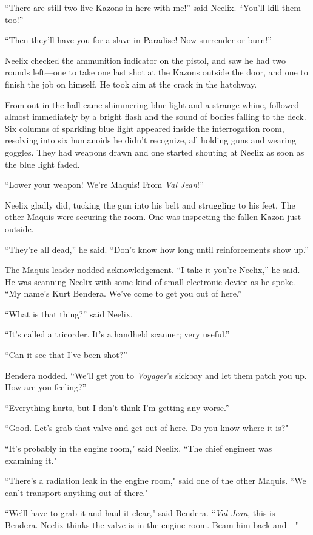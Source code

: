 \documentclass[twoside,letterpaper,12pt]{memoir}
\begin{document}
“There are still two live Kazons in here with me!” said Neelix. “You’ll kill them too!”

“Then they’ll have you for a slave in Paradise! Now surrender or burn!”

Neelix checked the ammunition indicator on the pistol, and saw he had two rounds left—one to take one last shot at the Kazons outside the door, and one to finish the job on himself. He took aim at the crack in the hatchway.

From out in the hall came shimmering blue light and a strange whine, followed almost immediately by a bright flash and the sound of bodies falling to the deck. Six columns of sparkling blue light appeared inside the interrogation room, resolving into six humanoids he didn’t recognize, all holding guns and wearing goggles. They had weapons drawn and one started shouting at Neelix as soon as the blue light faded.

“Lower your weapon! We’re Maquis! From \textit{Val Jean}!”

Neelix gladly did, tucking the gun into his belt and struggling to his feet. The other Maquis were securing the room. One was inspecting the fallen Kazon just outside.

“They’re all dead,” he said. “Don’t know how long until reinforcements show up.”

The Maquis leader nodded acknowledgement. “I take it you’re Neelix,” he said. He was scanning Neelix with some kind of small electronic device as he spoke. “My name’s Kurt Bendera. We’ve come to get you out of here.”

“What is that thing?” said Neelix.

“It’s called a tricorder. It’s a handheld scanner; very useful.”

“Can it see that I’ve been shot?”

Bendera nodded. “We’ll get you to \textit{Voyager}’s sickbay and let them patch you up. How are you feeling?”

“Everything hurts, but I don’t think I’m getting any worse.”

``Good. Let's grab that valve and get out of here. Do you know where it is?"

``It's probably in the engine room," said Neelix. ``The chief engineer was examining it."

``There's a radiation leak in the engine room," said one of the other Maquis. ``We can't transport anything out of there."

``We'll have to grab it and haul it clear," said Bendera. ``\textit{Val Jean}, this is Bendera. Neelix thinks the valve is in the engine room. Beam him back and---"
\end{document}
